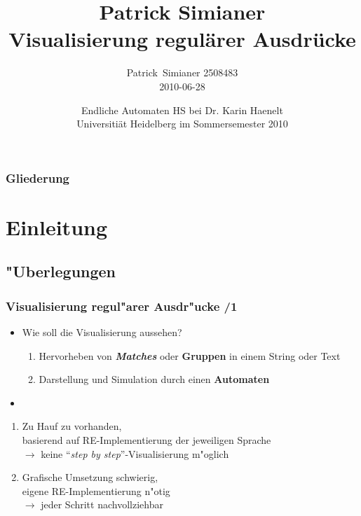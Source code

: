 \documentclass[ignorenonframetext]{beamer}
\title[regexvis]{Patrick Simianer\\ Visualisierung regulärer Ausdrücke}
\author{Patrick~Simianer \tiny 2508483\\\normalsize 2010-06-28}
\date{Endliche Automaten HS bei Dr. Karin Haenelt\\ Universitiät Heidelberg im Sommersemester 2010}
\begin{document}
\frame[plain]{\titlepage}



\begin{frame}[plain]
    \frametitle{Gliederung}
    \tableofcontents
\end{frame}



\section{Einleitung}


\subsection{"Uberlegungen}
\begin{frame}
    \frametitle{Visualisierung regul"arer Ausdr"ucke /1}
	
	\begin{itemize}
        \item[] Wie soll die Visualisierung aussehen?
        \begin{enumerate}
            \item Hervorheben von \textit{\textbf{Matches}} oder \textbf{Gruppen} in einem String oder Text
            \item Darstellung und Simulation durch einen \textbf{Automaten}
        \end{enumerate}
        \item[]
	\end{itemize}
    \begin{enumerate}
        \item Zu Hauf zu vorhanden, \\ basierend auf RE-Implementierung der jeweiligen Sprache\\ $\rightarrow$ keine ``\textit{step by step}''-Visualisierung m"oglich
        \item Grafische Umsetzung schwierig,\\ eigene RE-Implementierung n"otig\\ $\rightarrow$ jeder Schritt nachvollziehbar
    \end{enumerate}
\end{frame}
\end{document}
